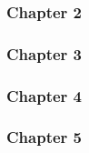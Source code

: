 {\color{Blue}\subsubsection{Chapter 2}}

\paragraph{}

{\color{Blue}\subsubsection{Chapter 3}}

\paragraph{}

{\color{Blue}\subsubsection{Chapter 4}}

\paragraph{}

{\color{Blue}\subsubsection{Chapter 5}}

\paragraph{}
